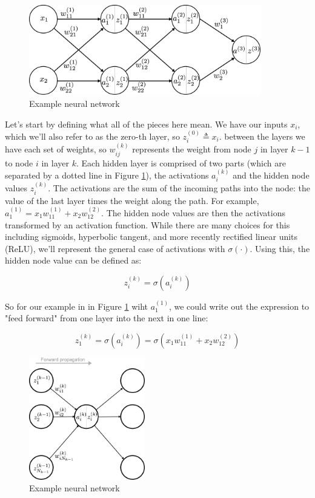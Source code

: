 \documentclass{article}
\begin{document}
\begin{figure}[h]
\centering
\includegraphics[width=0.9\textwidth]{./neural_networks.eps}
\caption{Example neural network}
\label{fig:nnexample}
\end{figure}

Let's start by defining what all of the pieces here mean. We have our inputs $x_i$, which we'll also refer to as the zero-th layer, so $z_i^{(0)} \triangleq x_i $. between the layers we have each set of weights, so $w_{ij}^{(k)}$ represents the weight from node $j$ in layer $k-1$ to node $i$ in layer $k$. Each hidden layer is comprised of two parts (which are separated by a dotted line in Figure \ref{fig:nnexample}), the activations $a_i^{(k)}$ and the hidden node values $z_i^{(k)}$. The activations are the sum of the incoming paths into the node: the value of the last layer times the weight along the path. For example, $a_1^{(1)}=x_1 w_{11}^{(1)} + x_2 w_{12}^{(2)}$. The hidden node values are then the activations transformed by an activation function. While there are many choices for this including sigmoids, hyperbolic tangent, and more recently rectified linear units (ReLU), we'll represent the general case of activations with $\sigma(\cdot)$. Using this, the hidden node value can be defined as:

\begin{equation}
    z_i^{(k)} = \sigma(a_i^{(k)})
\end{equation}

So for our example in in Figure \ref{fig:nnexample} wiht $a_1^{(1)}$, we could write out the expression to "feed forward" from one layer into the next in one line:

\begin{equation}
    z_1^{(k)} = \sigma(a_i^{(k)}) = \sigma(x_1 w_{11}^{(1)} + x_2 w_{12}^{(2)})
\end{equation}

\begin{figure}[h]
\centering
\includegraphics[width=0.45\textwidth]{./neural_networks_local_forward_propagation.eps}
\caption{Example neural network}
\label{fig:ff}
\end{figure}
\end{document}
